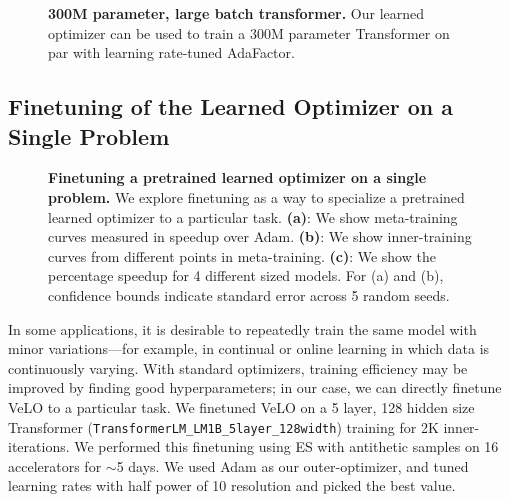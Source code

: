 \documentclass[11pt]{article}
\begin{document}
\begin{figure}[t!]
    \centering
    \caption{\textbf{300M parameter, large batch transformer.} Our learned optimizer can be used to train a 300M parameter Transformer on par with learning rate-tuned AdaFactor.
    \label{fig:pax_300m}
    }
\end{figure}

\subsection{Finetuning of the Learned Optimizer on a Single Problem} \label{app:per_task_finetune}
\begin{figure}[t!]
    \centering
    \caption{\textbf{Finetuning a pretrained learned optimizer on a single problem.} We explore finetuning as a way to specialize a pretrained learned optimizer to a particular task. \textbf{(a)}: We show meta-training curves measured in speedup over Adam. \textbf{(b)}: We show inner-training curves from different points in meta-training. \textbf{(c)}: We show the percentage speedup for 4 different sized models. For (a) and (b), confidence bounds indicate standard error across 5 random seeds.
    \label{fig:finetune_trans}
    }
\end{figure}

In some applications, it is desirable to repeatedly train the same model with minor variations---for example, in continual or online learning in which data is continuously varying.
With standard optimizers, training efficiency may be improved by finding good hyperparameters; in our case, we can directly finetune VeLO to a particular task. 
We finetuned VeLO on a 5 layer, 128 hidden size Transformer (\texttt{TransformerLM\_LM1B\_5layer\_128width}) training for 2K inner-iterations.
We performed this finetuning using ES with antithetic samples on 16 accelerators for $\sim$5 days.
We used Adam as our outer-optimizer, and tuned learning rates with half power of 10 resolution and picked the best value. 
\end{document}
